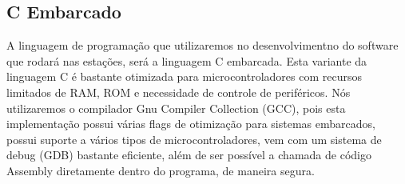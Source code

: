     \subsection{C Embarcado}
    A linguagem de programação que utilizaremos no desenvolvimentno do software que rodará
    nas estações, será a linguagem C embarcada. Esta variante da linguagem C é bastante otimizada
    para microcontroladores com recursos limitados de RAM, ROM e necessidade de controle de periféricos.
    Nós utilizaremos o compilador Gnu Compiler Collection (GCC), pois esta implementação possui várias flags
    de otimização para sistemas embarcados, possui suporte a vários tipos de microcontroladores, vem com
    um sistema de debug (GDB) bastante eficiente, além de ser possível a chamada de código Assembly diretamente
    dentro do programa, de maneira segura.